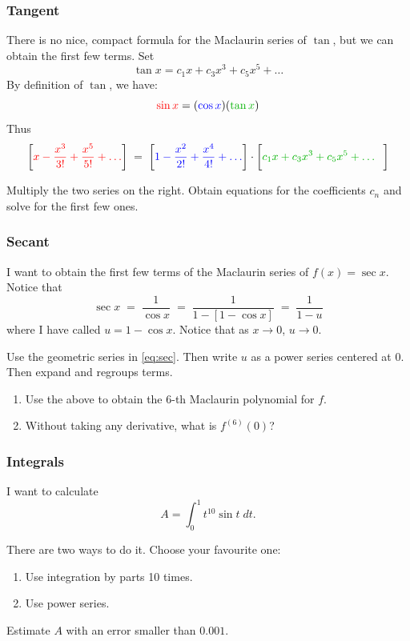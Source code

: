 \documentclass[14pt]{beamer}
\begin{document}
\begin{frame}[t]
	\fontsize{13}{13}\selectfont
	\frametitle{Tangent}

	There is no nice, compact formula for the Maclaurin series of $\tan$, but we can
	obtain the first few terms. Set
	\[
		\tan x = c_{1}x + c_{3}x^{3}+ c_{5}x^{5}+ \ldots
	\]
	By definition of $\tan$, we have:
	\[
		{\color{red} \sin x}= ({\color{blue} \cos x}) ({\color{verde} \tan x})
	\]
	Thus
	{\fontsize{11}{11}\selectfont \[\left[{\color{red} x - \frac{x^{3}}{3!} + \frac{x^{5}}{5!} + \ldots}\right] \; = \; \left[{\color{blue} 1 - \frac{x^{2}}{2!} + \frac{x^{4}}{4!} + \ldots}\right] \cdot \left[{\color{verde} c_1 x + c_3 x^3 + c_5 x^5 + \ldots}\phantom{\frac{1}{1}}\right]\] }

	Multiply the two series on the right. Obtain equations for the coefficients
	$c_{n}$ and solve for the first few ones.
\end{frame}

\begin{frame}[t]
	\fontsize{13}{13}\selectfont
	\frametitle{Secant}

	I want to obtain the first few terms of the Maclaurin series of $\displaystyle
	f(x) = \sec x$. Notice that
	\begin{equation}
		\label{eq:sec}\sec x \; = \; \frac{1}{\cos x}\; = \; \frac{1}{1 - \left[ 1 -
		\cos x\right]}\; = \; \frac{1}{1-u}
	\end{equation}
	where I have called $\displaystyle u = 1 - \cos x$. \; Notice that as $x \to 0$,
	$u \to 0$.
	\vspace{.2cm}

	Use the geometric series in \eqref{eq:sec}. Then write $u$ as a power series
	centered at 0. Then expand and regroups terms.
	\vspace{.5cm}

	\begin{enumerate}
		\item Use the above to obtain the 6-th Maclaurin polynomial for $f$.

		\item Without taking any derivative, what is $\displaystyle f^{(6)}(0)$?
	\end{enumerate}
\end{frame}

\begin{frame}[t]
	\frametitle{Integrals}

	I want to calculate
	\[
		A = \int_{0}^{1}t^{10}\sin t \; dt.
	\]

	There are two ways to do it. Choose your favourite one:
	\begin{enumerate}
		\item Use integration by parts 10 times.

		\item Use power series.
	\end{enumerate}
	\hrulefill
	\vspace{.5cm}

	Estimate $A$ with an error smaller than $0.001$.
\end{frame}
\end{document}
